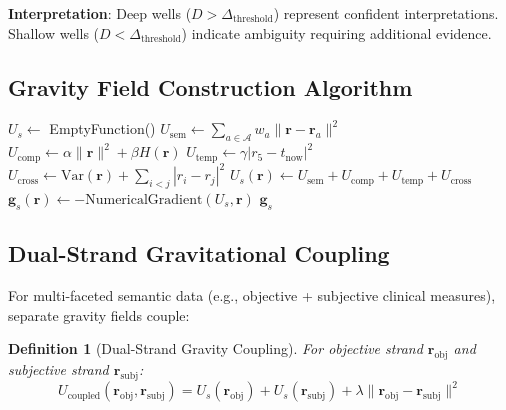 \documentclass[12pt,a4paper]{article}
\newtheorem{definition}{Definition}
\begin{document}
\textbf{Interpretation}: Deep wells ($D > \Delta_{\text{threshold}}$) represent confident interpretations. Shallow wells ($D < \Delta_{\text{threshold}}$) indicate ambiguity requiring additional evidence.

\subsection{Gravity Field Construction Algorithm}

\begin{algorithm}[H]
\caption{Semantic Gravity Field Construction}
\begin{algorithmic}[1]
\State $U_s \leftarrow$ EmptyFunction() 
 
    \State $U_{\text{sem}} \leftarrow \sum_{a \in \mathcal{A}} w_a \|\mathbf{r} - \mathbf{r}_a\|^2$ 
    \State $U_{\text{comp}} \leftarrow \alpha \|\mathbf{r}\|^2 + \beta H(\mathbf{r})$ 
    \State $U_{\text{temp}} \leftarrow \gamma |r_5 - t_{\text{now}}|^2$ 
    \State $U_{\text{cross}} \leftarrow \text{Var}(\mathbf{r}) + \sum_{i < j} |r_i - r_j|^2$ 
    \State $U_s(\mathbf{r}) \leftarrow U_{\text{sem}} + U_{\text{comp}} + U_{\text{temp}} + U_{\text{cross}}$
    \State $\mathbf{g}_s(\mathbf{r}) \leftarrow -\text{NumericalGradient}(U_s, \mathbf{r})$
\EndFor
\State \Return $\mathbf{g}_s$ 
\EndProcedure
\end{algorithmic}
\end{algorithm}

\subsection{Dual-Strand Gravitational Coupling}

For multi-faceted semantic data (e.g., objective + subjective clinical measures), separate gravity fields couple:

\begin{definition}[Dual-Strand Gravity Coupling]
For objective strand $\mathbf{r}_{\text{obj}}$ and subjective strand $\mathbf{r}_{\text{subj}}$:
\begin{equation}
U_{\text{coupled}}(\mathbf{r}_{\text{obj}}, \mathbf{r}_{\text{subj}}) = U_s(\mathbf{r}_{\text{obj}}) + U_s(\mathbf{r}_{\text{subj}}) + \lambda \|\mathbf{r}_{\text{obj}} - \mathbf{r}_{\text{subj}}\|^2
\end{equation}
\end{definition}
\end{document}
